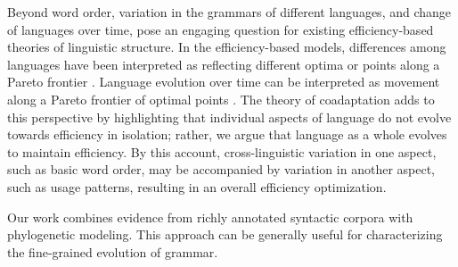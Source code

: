 \documentclass[9pt,twocolumn,twoside,lineno]{pnas-new}
\begin{document}
Beyond word order, variation in the grammars of different languages, and change of languages over time, pose an engaging question for existing efficiency-based theories of linguistic structure.
In the efficiency-based models, differences among languages have been interpreted as reflecting different optima or points along a Pareto frontier \citep{kemp2018semantic, zaslavsky2018efficient}.
Language evolution over time can be interpreted as movement along a Pareto frontier of optimal points \citep{zaslavsky2019evolution}. %
The theory of coadaptation adds to this perspective by highlighting that individual aspects of language do not evolve towards efficiency in isolation; rather, we argue that language as a whole evolves to maintain efficiency.
By this account, cross-linguistic variation in one aspect, such as basic word order, may be accompanied by variation in another aspect, such as usage patterns, resulting in an overall efficiency optimization.

Our work combines evidence from richly annotated syntactic corpora with phylogenetic modeling. This approach can be generally useful for characterizing the fine-grained evolution of grammar.


\end{document}
